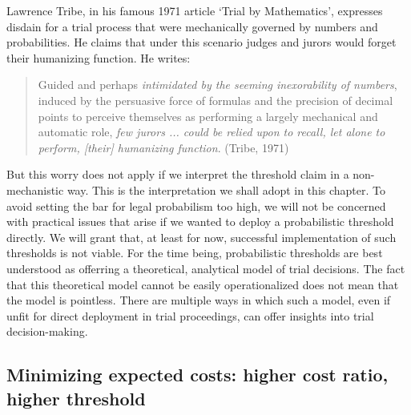 \documentclass[10pt,dvipsnames,enabledeprecatedfontcommands]{scrartcl}
\begin{document}
Lawrence Tribe, in his famous 1971 article `Trial by Mathematics',
expresses disdain for a trial process that were mechanically governed by
numbers and probabilities. He claims that under this scenario judges and
jurors would forget their humanizing function. He writes:

\begin{quote}
Guided and perhaps
\textit{intimidated by the seeming inexorability of numbers}, induced by
the persuasive force of formulas and the precision of decimal points to
perceive themselves as performing a largely mechanical and automatic
role, \textit{few jurors ... 
could be relied upon to recall, let alone to 
perform, [their] humanizing function}. \hspace*{\fill} (Tribe, 1971)
\end{quote}

\noindent
But this worry does not apply if we interpret the threshold claim in a
non-mechanistic way. This is the interpretation we shall adopt in this
chapter. To avoid setting the bar for legal probabilism too high, we
will not be concerned with practical issues that arise if we wanted to
deploy a probabilistic threshold directly. We will grant that, at least
for now, successful implementation of such thresholds is not viable. For
the time being, probabilistic thresholds are best understood as
offerring a theoretical, analytical model of trial decisions. The fact
that this theoretical model cannot be easily operationalized does not
mean that the model is pointless. There are multiple ways in which such
a model, even if unfit for direct deployment in trial proceedings, can
offer insights into trial decision-making.

\subsection{Minimizing expected costs: higher cost ratio, higher
threshold}\label{minimizing-expected-costs-higher-cost-ratio-higher-threshold}
\end{document}
